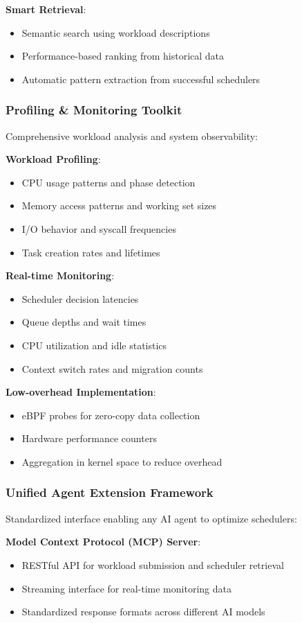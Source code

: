 \textbf{Smart Retrieval}:
\begin{itemize}
\item Semantic search using workload descriptions
\item Performance-based ranking from historical data
\item Automatic pattern extraction from successful schedulers
\end{itemize}

\subsubsection{Profiling \& Monitoring Toolkit}
Comprehensive workload analysis and system observability:

\textbf{Workload Profiling}:
\begin{itemize}
\item CPU usage patterns and phase detection
\item Memory access patterns and working set sizes
\item I/O behavior and syscall frequencies
\item Task creation rates and lifetimes
\end{itemize}

\textbf{Real-time Monitoring}:
\begin{itemize}
\item Scheduler decision latencies
\item Queue depths and wait times
\item CPU utilization and idle statistics
\item Context switch rates and migration counts
\end{itemize}

\textbf{Low-overhead Implementation}:
\begin{itemize}
\item eBPF probes for zero-copy data collection
\item Hardware performance counters
\item Aggregation in kernel space to reduce overhead
\end{itemize}

\subsubsection{Unified Agent Extension Framework}
Standardized interface enabling any AI agent to optimize schedulers:

\textbf{Model Context Protocol (MCP) Server}:
\begin{itemize}
\item RESTful API for workload submission and scheduler retrieval
\item Streaming interface for real-time monitoring data
\item Standardized response formats across different AI models
\end{itemize}

